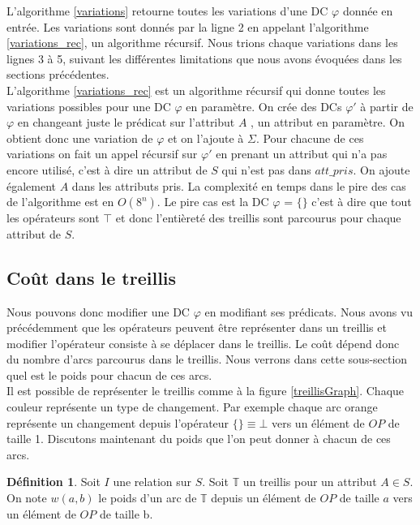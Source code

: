\documentclass[letterpaper, 12pt]{report}
\theoremstyle{definition}
\newtheorem{mydef}{Définition}
\begin{document}
L'algorithme \ref{variations} retourne toutes les variations d'une DC $\varphi$ donnée en entrée. Les variations sont donnés par la ligne 2 en appelant l'algorithme \ref{variations_rec}, un algorithme récursif. Nous trions chaque variations dans les lignes 3 à 5, suivant les différentes limitations que nous avons évoquées dans les sections précédentes.\\

L'algorithme \ref{variations_rec} est un algorithme récursif qui donne toutes les variations possibles pour une DC $\varphi$ en paramètre. On crée des DCs $\varphi'$ à partir de $\varphi$ en changeant juste le prédicat sur l'attribut $A$ , un attribut en paramètre. On obtient donc une variation de $\varphi$ et on l'ajoute à $\Sigma$. Pour chacune de ces variations on fait un appel récursif sur $\varphi'$ en prenant un attribut qui n'a pas encore utilisé, c'est à dire un attribut de $S$ qui n'est pas dans $att\_pris$. On ajoute également $A$ dans les attributs pris. La complexité en temps dans le pire des cas de l'algorithme est en $O(8^{n})$. Le pire cas est la DC $\varphi$ = $\{\}$ c'est à dire que tout les opérateurs sont $\top$ et donc l'entièreté des treillis sont parcourus pour chaque attribut de $S$.

\subsection{Coût dans le treillis}

Nous pouvons donc modifier une DC $\varphi$ en modifiant ses prédicats. Nous avons vu précédemment que les opérateurs peuvent être représenter dans un treillis et modifier l'opérateur consiste à se déplacer dans le treillis. Le coût dépend donc du nombre d'arcs parcourus dans le treillis. Nous verrons dans cette sous-section quel est le poids pour chacun de ces arcs.\\

Il est possible de représenter le treillis comme à la figure \ref{treillisGraph}. Chaque couleur représente un type de changement. Par exemple chaque arc orange représente un changement depuis l'opérateur $\{ \} \equiv \bot$ vers un élément de $OP$ de taille 1. Discutons maintenant du poids que l'on peut donner à chacun de ces arcs.

\begin{mydef}

	Soit $I$ une relation sur $S$. Soit $\mathbb{T}$ un treillis pour un attribut $A \in S$. On note $w(a,b)$ le poids d'un arc de $\mathbb{T}$ depuis un élément de $OP$ de taille $a$ vers un élément de $OP$ de taille b.

\end{mydef}
\end{document}
